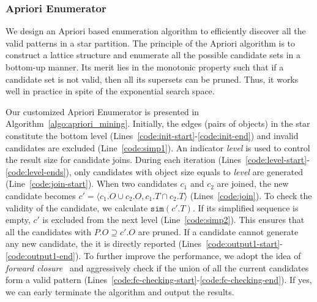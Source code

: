 \subsubsection{Apriori Enumerator}
We design an Apriori based enumeration algorithm to efficiently discover all the valid patterns in a star partition. The principle of the Apriori algorithm is to construct a lattice structure and enumerate all the possible candidate sets in a bottom-up manner. Its merit lies in the monotonic property such that if a candidate set is not valid, then all its supersets can be pruned. Thus, it works well in practice in spite of the exponential search space.

Our customized Apriori Enumerator is presented in Algorithm~\ref{algo:apriori_mining}. Initially, the edges (pairs of objects) in the star constitute the bottom level (Lines~\ref{code:init-start}-\ref{code:init-end}) and invalid candidates are excluded (Line~\ref{code:simp1}). An indicator \emph{level} is used to control the result size for candidate joins. During each iteration (Lines~\ref{code:level-start}-\ref{code:level-ends}), only candidates with object size equals to \emph{level} are generated (Line~\ref{code:join-start}). When two candidates $c_1$ and $c_2$ are joined, the new candidate becomes $c'=\langle c_1.O \cup c_2.O, c_1.T\cap c_2.T\rangle$ (Lines~\ref{code:join}). To check the validity of the candidate, we calculate $\mathtt{sim}(c'.T)$. If its simplified sequence is empty, $c'$ is excluded from the next level (Line~\ref{code:simp2}). This ensures that all the candidates with $P.O\supseteq c'.O$ are pruned. If a candidate cannot generate any new candidate, the
it is directly reported (Lines~\ref{code:output1-start}-\ref{code:output1-end}).
To further improve the performance, we adopt the idea of \textit{forward closure}~\cite{wang2003closet+,pei2000closet} and  aggressively check if the union of all the current candidates form a valid pattern (Lines~\ref{code:fc-checking-start}-\ref{code:fc-checking-end}). If yes, we can early terminate the algorithm and output the results.

